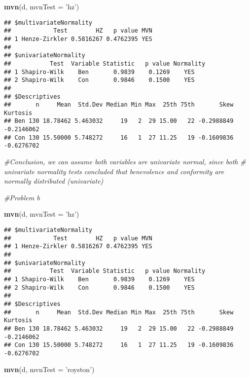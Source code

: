 \documentclass[
]{article}
\newenvironment{Shaded}{\begin{snugshade}}{\end{snugshade}}
\newcommand{\CommentTok}[1]{\textcolor[rgb]{0.56,0.35,0.01}{\textit{#1}}}
\newcommand{\DataTypeTok}[1]{\textcolor[rgb]{0.13,0.29,0.53}{#1}}
\newcommand{\KeywordTok}[1]{\textcolor[rgb]{0.13,0.29,0.53}{\textbf{#1}}}
\newcommand{\NormalTok}[1]{#1}
\newcommand{\StringTok}[1]{\textcolor[rgb]{0.31,0.60,0.02}{#1}}
\begin{document}
\begin{Shaded}
\begin{Highlighting}[]
\KeywordTok{mvn}\NormalTok{(d, }\DataTypeTok{mvnTest =} \StringTok{'hz'}\NormalTok{)}
\end{Highlighting}
\end{Shaded}

\begin{verbatim}
## $multivariateNormality
##            Test        HZ   p value MVN
## 1 Henze-Zirkler 0.5816267 0.4762395 YES
## 
## $univariateNormality
##           Test  Variable Statistic   p value Normality
## 1 Shapiro-Wilk    Ben       0.9839    0.1269    YES   
## 2 Shapiro-Wilk    Con       0.9846    0.1500    YES   
## 
## $Descriptives
##       n     Mean  Std.Dev Median Min Max  25th 75th       Skew   Kurtosis
## Ben 130 18.78462 5.463032     19   2  29 15.00   22 -0.2988849 -0.2146062
## Con 130 15.50000 5.748272     16   1  27 11.25   19 -0.1609836 -0.6276702
\end{verbatim}

\begin{Shaded}
\begin{Highlighting}[]
\CommentTok{#Conclusion, we can assume both variables are univariate normal, since both }
\CommentTok{# univariate normality tests concluded that benevolence and conformity are normally distributed (univariate)}


\CommentTok{#Problem b}

\KeywordTok{mvn}\NormalTok{(d, }\DataTypeTok{mvnTest =} \StringTok{'hz'}\NormalTok{)}
\end{Highlighting}
\end{Shaded}

\begin{verbatim}
## $multivariateNormality
##            Test        HZ   p value MVN
## 1 Henze-Zirkler 0.5816267 0.4762395 YES
## 
## $univariateNormality
##           Test  Variable Statistic   p value Normality
## 1 Shapiro-Wilk    Ben       0.9839    0.1269    YES   
## 2 Shapiro-Wilk    Con       0.9846    0.1500    YES   
## 
## $Descriptives
##       n     Mean  Std.Dev Median Min Max  25th 75th       Skew   Kurtosis
## Ben 130 18.78462 5.463032     19   2  29 15.00   22 -0.2988849 -0.2146062
## Con 130 15.50000 5.748272     16   1  27 11.25   19 -0.1609836 -0.6276702
\end{verbatim}

\begin{Shaded}
\begin{Highlighting}[]
\KeywordTok{mvn}\NormalTok{(d, }\DataTypeTok{mvnTest =} \StringTok{'royston'}\NormalTok{)}
\end{Highlighting}
\end{Shaded}
\end{document}
